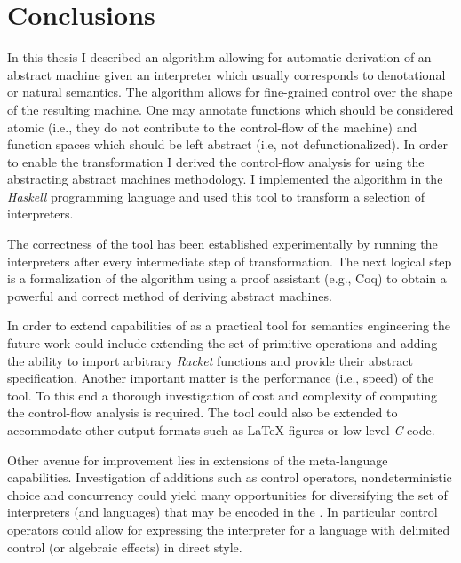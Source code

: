 \chapter{Conclusions}\label{chapter:conclusions}
In this thesis I described an algorithm allowing for automatic derivation of an abstract machine given an interpreter which usually corresponds to denotational or natural semantics.
The algorithm allows for fine-grained control over the shape of the resulting machine.
One may annotate functions which should be considered atomic (i.e., they do not contribute to the control-flow of the machine) and function spaces which should be left abstract (i.e, not defunctionalized).
In order to enable the transformation I derived the control-flow analysis for \IDL{} using the abstracting abstract machines methodology.
I implemented the algorithm in the \textit{Haskell} programming language and used this tool to transform a selection of interpreters.

The correctness of the tool has been established experimentally by running the interpreters after every intermediate step of transformation.
The next logical step is a formalization of the algorithm using a proof assistant (e.g., Coq) to obtain a powerful and correct method of deriving abstract machines.

In order to extend capabilities of \semt{} as a practical tool for semantics engineering the future work could include extending the set of primitive operations and adding the ability to import arbitrary \textit{Racket} functions and provide their abstract specification.
Another important matter is the performance (i.e., speed) of the tool.
To this end a thorough investigation of cost and complexity of computing the control-flow analysis is required.
The tool could also be extended to accommodate other output formats such as \LaTeX{} figures or low level \textit{C} code.

Other avenue for improvement lies in extensions of the meta-language capabilities.
Investigation of additions such as control operators, nondeterministic choice and concurrency could yield many opportunities for diversifying the set of interpreters (and languages) that may be encoded in the \IDL{}.
In particular control operators could allow for expressing the interpreter for a language with delimited control (or algebraic effects) in direct style.